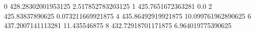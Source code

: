 0 428.28302001953125 2.517852783203125
1 425.7651672363281 0.0
2 425.83837890625 0.073211669921875
4 435.86492919921875 10.099761962890625
6 437.2007141113281 11.435546875
8 432.72918701171875 6.964019775390625
